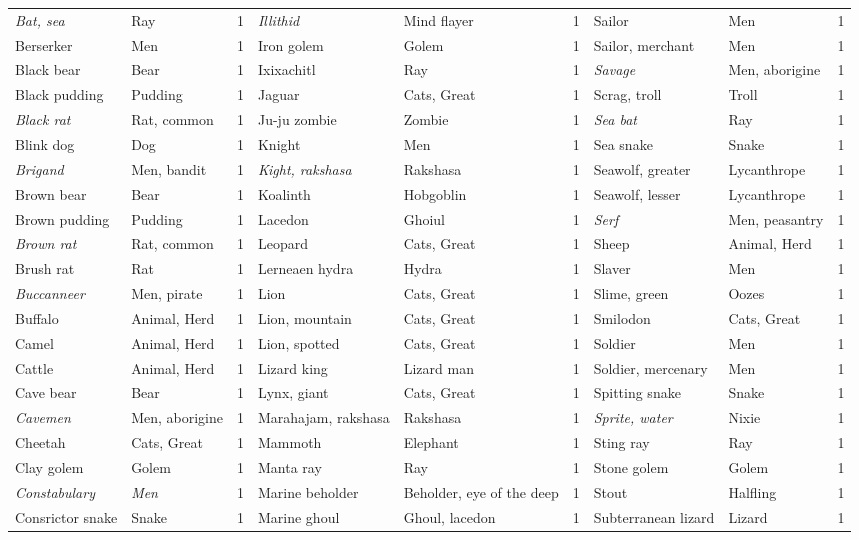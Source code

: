 \documentclass[../main.tex]{subfiles}
\begin{document}
\begin{table}[H]
{\begin{tabular}{llcllcllc}
\textit{Bat, sea} & Ray & 1 & \textit{Illithid} & Mind flayer & 1 & Sailor & Men & 1 \\
Berserker & Men & 1 & Iron golem & Golem & 1 & Sailor, merchant & Men & 1 \\
Black bear & Bear & 1 & Ixixachitl & Ray & 1 & \textit{Savage} & Men, aborigine & 1 \\
Black pudding & Pudding & 1 & Jaguar & Cats, Great & 1 & Scrag, troll & Troll & 1 \\
\textit{Black rat} & Rat, common & 1 & Ju-ju zombie & Zombie & 1 & \textit{Sea bat} & Ray & 1 \\
Blink dog & Dog & 1 & Knight & Men & 1 & Sea snake & Snake & 1 \\
\textit{Brigand} & Men, bandit & 1 & \textit{Kight, rakshasa} & Rakshasa & 1 & Seawolf, greater & Lycanthrope & 1 \\
Brown bear & Bear & 1 & Koalinth & Hobgoblin & 1 & Seawolf, lesser & Lycanthrope & 1 \\
Brown pudding & Pudding & 1 & Lacedon & Ghoiul & 1 & \textit{Serf} & Men, peasantry & 1 \\
\textit{Brown rat} & Rat, common & 1 & Leopard & Cats, Great & 1 & Sheep & Animal, Herd & 1 \\
Brush rat & Rat & 1 & Lerneaen hydra & Hydra & 1 & Slaver & Men & 1 \\
\textit{Buccanneer} & Men, pirate & 1 & Lion & Cats, Great & 1 & Slime, green & Oozes & 1 \\
Buffalo & Animal, Herd & 1 & Lion, mountain & Cats, Great & 1 & Smilodon & Cats, Great & 1 \\
Camel & Animal, Herd & 1 & Lion, spotted & Cats, Great & 1 & Soldier & Men & 1 \\
Cattle & Animal, Herd & 1 & Lizard king & Lizard man & 1 & Soldier, mercenary & Men & 1 \\
Cave bear & Bear & 1 & Lynx, giant & Cats, Great & 1 & Spitting snake & Snake & 1 \\
\textit{Cavemen} & Men, aborigine & 1 & Marahajam, rakshasa & Rakshasa & 1 & \textit{Sprite, water} & Nixie & 1 \\
Cheetah & Cats, Great & 1 & Mammoth & Elephant & 1 & Sting ray & Ray & 1 \\
Clay golem & Golem & 1 & Manta ray & Ray & 1 & Stone golem & Golem & 1 \\
\textit{Constabulary} & \textit{Men} & 1 & Marine beholder & Beholder, eye of the deep & 1 & Stout & Halfling & 1 \\
Consrictor snake & Snake & 1 & Marine ghoul & Ghoul, lacedon & 1 & Subterranean lizard & Lizard & 1 \\

\end{tabular}}
\end{table}
\end{document}
